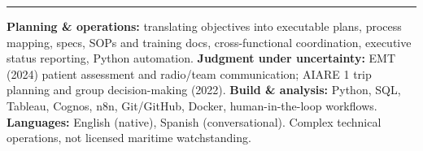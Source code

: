 \documentclass[10pt,letterpaper]{article}
\newcommand{\cvsection}[1]{%
  \vspace{7pt}%
  \noindent{\bfseries\fontsize{11pt}{13pt}\selectfont\MakeUppercase{#1}}\par
  \vspace{1pt}%
  \noindent\rule{\textwidth}{0.4pt}\par
  \vspace{4pt}%
}
\begin{document}
\cvsection{Skills}

{\raggedright
\noindent\textbf{Planning \& operations:} translating objectives into executable plans, process mapping, specs, SOPs and training docs, cross-functional coordination, executive status reporting, Python automation. \textbf{Judgment under uncertainty:} EMT (2024) patient assessment and radio/team communication; AIARE 1 trip planning and group decision-making (2022). \textbf{Build \& analysis:} Python, SQL, Tableau, Cognos, n8n, Git/GitHub, Docker, human-in-the-loop workflows. \textbf{Languages:} English (native), Spanish (conversational). Complex technical operations, not licensed maritime watchstanding.\par
}
\end{document}
